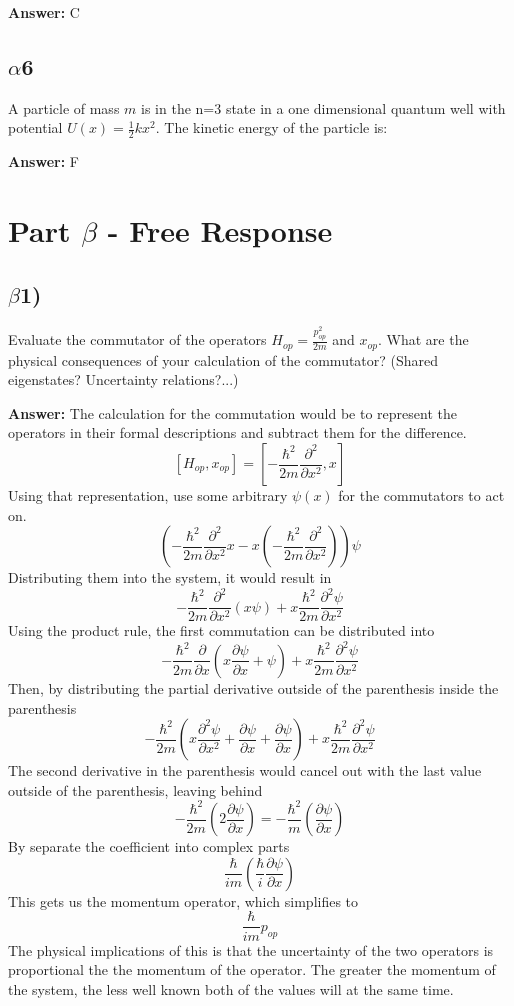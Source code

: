 \documentclass[10pt,letterpaper]{article}
\begin{document}
\textbf{Answer: }C
\subsection*{$\alpha$6}
\noindent A particle of mass $m$ is in the n=3 state in a one dimensional quantum well with potential $U(x) = \frac{1}{2}kx^{2}$. The kinetic energy of the particle is:

\textbf{Answer: }F

\section*{Part $\beta$ - Free Response}
\subsection*{$\beta$1)}
\noindent Evaluate the commutator of the operators $H_{op} = \frac{p_{op}^{2}}{2m}$ and $x_{op}$. What are the physical consequences of your calculation of the commutator? (Shared eigenstates? Uncertainty relations?...)

\textbf{Answer: }The calculation for the commutation would be to represent the operators in their formal descriptions and subtract them for the difference.
$$[H_{op}, x_{op}] = \left[-\frac{\hbar^{2}}{2m} \frac{\partial^{2}}{\partial x^{2}}, x\right]$$
Using that representation, use some arbitrary $\psi(x)$ for the commutators to act on.
$$\left( -\frac{\hbar^{2}}{2m} \frac{\partial^{2}}{\partial x^{2}}x -x\left(-\frac{\hbar^{2}}{2m} \frac{\partial^{2}}{\partial x^{2}}\right) \right) \psi$$
Distributing them into the system, it would result in 
$$-\frac{\hbar^{2}}{2m} \frac{\partial^{2}}{\partial x^{2}}(x\psi) + x\frac{\hbar^{2}}{2m} \frac{\partial^{2}\psi}{\partial x^{2}}$$
Using the product rule, the first commutation can be distributed into
$$-\frac{\hbar^{2}}{2m} \frac{\partial}{\partial x} \left( x\frac{\partial \psi}{\partial x} + \psi \right) + x\frac{\hbar^{2}}{2m} \frac{\partial^{2} \psi}{\partial x^{2}}$$
Then, by distributing the partial derivative outside of the parenthesis inside the parenthesis
$$-\frac{\hbar^{2}}{2m} \left( x\frac{\partial^{2} \psi}{\partial x^{2}} + \frac{\partial \psi}{\partial x} + \frac{\partial \psi}{\partial x} \right) + x\frac{\hbar^{2}}{2m} \frac{\partial^{2} \psi}{\partial x^{2}}$$
The second derivative in the parenthesis would cancel out with the last value outside of the parenthesis, leaving behind
$$-\frac{\hbar^{2}}{2m} \left(2\frac{\partial \psi}{\partial x}\right) = -\frac{\hbar^{2}}{m} \left(\frac{\partial \psi}{\partial x}\right)$$
By separate the coefficient into complex parts
$$\frac{\hbar}{im} \left( \frac{\hbar}{i} \frac{\partial \psi}{\partial x} \right)$$
This gets us the momentum operator, which simplifies to 
$$\frac{\hbar}{im} p_{op}$$
The physical implications of this is that the uncertainty of the two operators is proportional the the momentum of the operator. The greater the momentum of the system, the less well known both of the values will at the same time. 
\end{document}
